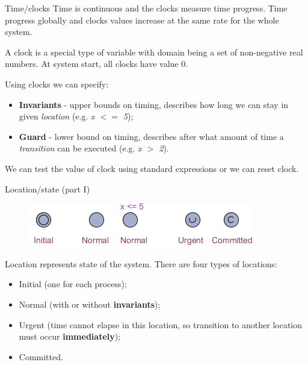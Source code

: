 \documentclass{beamer}
\begin{document}
\begin{frame}{Time/clocks}
	Time is continuous and the clocks measure time progress. Time progress globally and clocks values increase at the same rate for the whole system.\newline
	
	A clock is a special type of variable with domain being a set of non-negative real numbers. At system start, all clocks have value 0.\newline
	
	Using clocks we can specify:
	\begin{itemize}
		\item \textbf{Invariants} - upper bounds on timing, describes how long we can stay in given \textit{location} (e.g. \textit{x $<=$ 5});
		\item \textbf{Guard} - lower bound on timing, describes after what amount of time a \textit{transition} can be executed (e.g. \textit{x $>$ 2}).
	\end{itemize}
	
	We can test the value of clock using standard expressions or we can reset clock.
\end{frame}

\begin{frame}{Location/state (part I)}
	\begin{figure}[H]
		\includegraphics[scale=1]{img/uppaal_locations.png}
	\end{figure}
	
	Location represents state of the system. There are four types of locations:
	\begin{itemize}
		\item Initial (one for each process);
		\item Normal (with or without \textbf{invariants});
		\item Urgent (time cannot elapse in this location, so transition to another location must occur \textbf{immediately});
		\item Committed.
	\end{itemize}
\end{frame}
\end{document}
